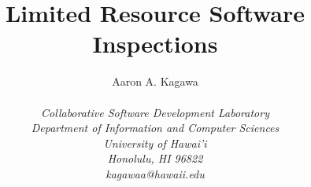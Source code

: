 \documentclass[11pt,twocolumn]{article}
\begin{document}
\title{Limited Resource Software Inspections}

\author{\protect\begin{tabular}{ccc}
Aaron A. Kagawa \\
\end{tabular}\\
\em  Collaborative Software Development Laboratory \\
\em  Department of Information and Computer Sciences \\
\em  University of Hawai'i \\
\em  Honolulu, HI 96822 \\
\em  kagawaa@hawaii.edu}
\maketitle
\thispagestyle{empty}
\end{document}
